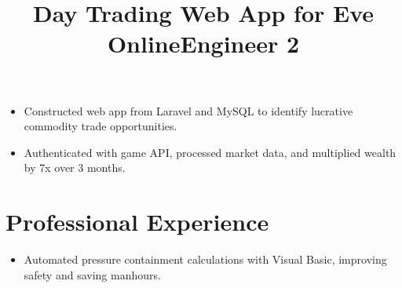 \documentclass[12pt]{res} %
\begin{document}
\begin{resume}
        \employer{}
        \title{\textbf{Day Trading Web App for Eve Online}}
        \dates{}
        \begin{position}
          \vspace{-28pt}
          \begin{itemize}[leftmargin=-0.4cm, rightmargin=0.8cm]
          \itemsep0em
          \item Constructed web app from Laravel and MySQL to  identify lucrative commodity trade opportunities.
          \item Authenticated with game API, processed market data, and multiplied wealth by 7x over 3 months.
          \end{itemize}
        \end{position}
        \vspace{-10pt}


      \section{Professional Experience}
      \vspace{2pt}

        \title{\textbf{Engineer 2}}
        \begin{position}
          \vspace{-14pt}
          \begin{itemize}[leftmargin=-0.4cm, rightmargin=0.8cm]
          \itemsep0em
          \item Automated pressure containment calculations with Visual Basic, improving safety and saving manhours.
          \end{itemize}
        \end{position}
        \vspace{-10pt}


\end{resume}
\end{document}
